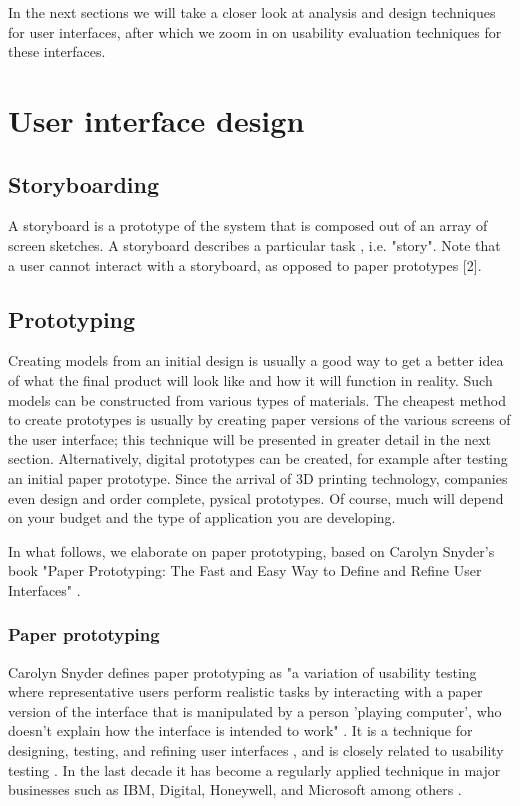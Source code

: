 In the next sections we will take a closer look at analysis and design techniques for user interfaces, after which we zoom in on usability evaluation techniques for these interfaces.



\section{User interface design}

\subsection{Storyboarding}

A storyboard is a prototype of the system that is composed out of an array of screen sketches. A storyboard describes a particular task , i.e. "story". Note that a user cannot interact with a storyboard, as opposed to paper prototypes [2].


\subsection{Prototyping}

Creating models from an initial design is usually a good way to get a better idea of what the final product will look like and how it will function in reality. Such models can be constructed from various types of materials. The cheapest method to create prototypes is usually by creating paper versions of the various screens of the user interface; this technique will be presented in greater detail in the next section. Alternatively, digital prototypes can be created, for example after testing an initial paper prototype. Since the arrival of 3D printing technology, companies even design and order complete, pysical prototypes. Of course, much will depend on your budget and the type of application you are developing.

In what follows, we elaborate on paper prototyping, based on Carolyn Snyder's book "Paper Prototyping: The Fast and Easy Way to Define and Refine User Interfaces" \cite{Snyder:2003}.

\subsubsection{Paper prototyping}

Carolyn Snyder defines paper prototyping as "a variation of usability testing where representative users perform realistic tasks by interacting with a paper version of the interface that is manipulated by a person 'playing computer', who doesn't explain how the interface is intended to work" \cite{}. It is a technique for designing, testing, and refining user interfaces \cite{Snyder:2003}, and is closely related to usability testing \cite{}. In the last decade it has become a regularly applied technique in major businesses such as IBM, Digital, Honeywell, and Microsoft among others \cite{Snyder:2003}.

